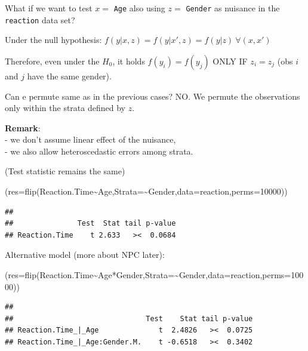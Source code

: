 \documentclass[
]{article}
\newenvironment{Shaded}{\begin{snugshade}}{\end{snugshade}}
\newcommand{\AttributeTok}[1]{\textcolor[rgb]{0.77,0.63,0.00}{#1}}
\newcommand{\DecValTok}[1]{\textcolor[rgb]{0.00,0.00,0.81}{#1}}
\newcommand{\FunctionTok}[1]{\textcolor[rgb]{0.00,0.00,0.00}{#1}}
\newcommand{\NormalTok}[1]{#1}
\newcommand{\SpecialCharTok}[1]{\textcolor[rgb]{0.00,0.00,0.00}{#1}}
\begin{document}
What if we want to test \(x=\) \texttt{Age} also using \(z=\)
\texttt{Gender} as nuisance in the \texttt{reaction} data set?

Under the null hypothesis:
\(f(y|x,z)=f(y|x',z)=f(y|z) \ \forall (x,x')\)

Therefore, even under the \(H_0\), it holds \(f(y_i)=f(y_j)\) ONLY IF
\(z_i=z_j\) (obs \(i\) and \(j\) have the same gender).

Can e permute same as in the previous cases? NO. We permute the
observations only within the strata defined by \(z\).

\textbf{Remark}:\\
- we don't assume linear effect of the nuisance,\\
- we also allow heteroscedastic errors among strata.

(Test statistic remains the same)

\begin{Shaded}
\begin{Highlighting}[]
\NormalTok{(}\AttributeTok{res=}\FunctionTok{flip}\NormalTok{(Reaction.Time}\SpecialCharTok{\textasciitilde{}}\NormalTok{Age,}\AttributeTok{Strata=}\SpecialCharTok{\textasciitilde{}}\NormalTok{Gender,}\AttributeTok{data=}\NormalTok{reaction,}\AttributeTok{perms=}\DecValTok{10000}\NormalTok{))}
\end{Highlighting}
\end{Shaded}

\begin{verbatim}
## 
##               Test  Stat tail p-value
## Reaction.Time    t 2.633   ><  0.0684
\end{verbatim}

Alternative model (more about NPC later):

\begin{Shaded}
\begin{Highlighting}[]
\NormalTok{(}\AttributeTok{res=}\FunctionTok{flip}\NormalTok{(Reaction.Time}\SpecialCharTok{\textasciitilde{}}\NormalTok{Age}\SpecialCharTok{*}\NormalTok{Gender,}\AttributeTok{Strata=}\SpecialCharTok{\textasciitilde{}}\NormalTok{Gender,}\AttributeTok{data=}\NormalTok{reaction,}\AttributeTok{perms=}\DecValTok{10000}\NormalTok{))}
\end{Highlighting}
\end{Shaded}

\begin{verbatim}
## 
##                               Test    Stat tail p-value
## Reaction.Time_|_Age              t  2.4826   ><  0.0725
## Reaction.Time_|_Age:Gender.M.    t -0.6518   ><  0.3402
\end{verbatim}
\end{document}

